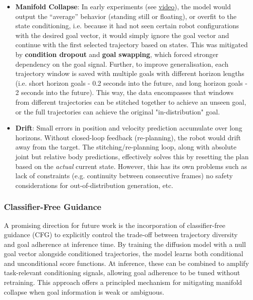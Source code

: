 \begin{itemize}
\item \textbf{Manifold Collapse}\label{manifold-collapse}:
In early experiments (see \href{https://drive.google.com/file/d/1NDqOBI__rWL8zhXncBfRyKJhDk9QqMrt/view?usp=drive_link}{video}), the model would output the ``average'' behavior
(standing still or floating), or overfit to the state conditioning, i.e. because it had not seen certain robot configurations with the desired goal vector, it would simply ignore the goal vector and continue with the first selected trajectory based on states. This
was mitigated by \textbf{condition dropout} and \textbf{goal
swapping}, which forced stronger dependency on the goal signal. Further, to improve generalisation, each trajectory window is saved with multiple goals with different horizon lengths (i.e. short horizon goals - 0.2 seconds into the future, and long horizon goals - 2 seconds into the future). This way, the data encompasses that windows from different trajectories can be stitched together to achieve an unseen goal, or the full trajectories can achieve the original "in-distribution" goal.

\item \textbf{Drift}\label{drift}:
Small errors in position and velocity prediction accumulate over long horizons.
Without closed-loop feedback (re-planning), the robot would drift away
from the target. The stitching/re-planning loop, along with absolute joint but relative body predictions, effectively solves this by resetting the plan based on the \emph{actual} current state. However, this has its own problems such as lack of constraints (e.g. continuity between consecutive frames) no safety considerations for out-of-distribution generation, etc.
\end{itemize}

\subsubsection{Classifier-Free Guidance}
A promising direction for future work is the incorporation of classifier-free guidance (CFG) to explicitly control the trade-off between trajectory diversity and goal adherence at inference time. By training the diffusion model with a null goal vector alongside conditioned trajectories, the model learns both conditional and unconditional score functions. At inference, these can be combined to amplify task-relevant conditioning signals, allowing goal adherence to be tuned without retraining. This approach offers a principled mechanism for mitigating manifold collapse when goal information is weak or ambiguous.

